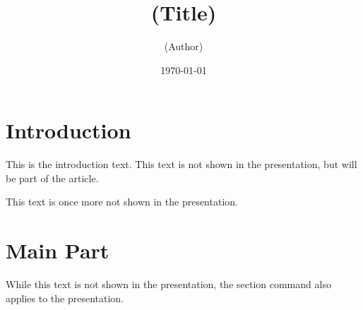 \usepackage{amsmath}
\usepackage[capitalize]{cleveref}
\usepackage{catchfilebetweentags}

\begin{frame}[label=title]
\title{(Title)}
\author{(Author)}
\date{\today}
\maketitle
\end{frame}
\section{Introduction}
\label{sec:intro}
This is the introduction text. This text is not shown in the
presentation, but will be part of the article.

This text is once more not shown in the presentation.
\section{Main Part}
\label{sec:main}
While this text is not shown in the presentation, the section command
also applies to the presentation.

